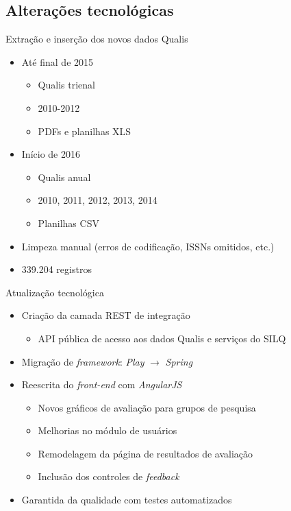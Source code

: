 \documentclass{beamer}
\begin{document}
\subsection{Alterações tecnológicas}

\begin{frame}{Extração e inserção dos novos dados Qualis}
  \begin{itemize}
    \item Até final de 2015
    \begin{itemize}
      \item Qualis trienal
      \item 2010-2012
      \item PDFs e planilhas XLS
    \end{itemize}

    \item Início de 2016
      \begin{itemize}
        \item Qualis anual
        \item 2010, 2011, 2012, 2013, 2014
        \item Planilhas CSV
      \end{itemize}

    \item Limpeza manual (erros de codificação, ISSNs omitidos, etc.)
    \item 339.204 registros
  \end{itemize}
\end{frame}

\begin{frame}{Atualização tecnológica}
  \begin{itemize}
    \item Criação da camada REST de integração
    \begin{itemize}
      \item API pública de acesso aos dados Qualis e serviços do SILQ
    \end{itemize}
    \item Migração de \textit{framework}: \textit{Play} $\rightarrow$ \textit{Spring}
    \item Reescrita do \textit{front-end} com \textit{AngularJS}
    \begin{itemize}
      \item Novos gráficos de avaliação para grupos de pesquisa
      \item Melhorias no módulo de usuários
      \item Remodelagem da página de resultados de avaliação
      \item Inclusão dos controles de \textit{feedback}
    \end{itemize}
    \item Garantida da qualidade com testes automatizados
  \end{itemize}
\end{frame}
\end{document}
